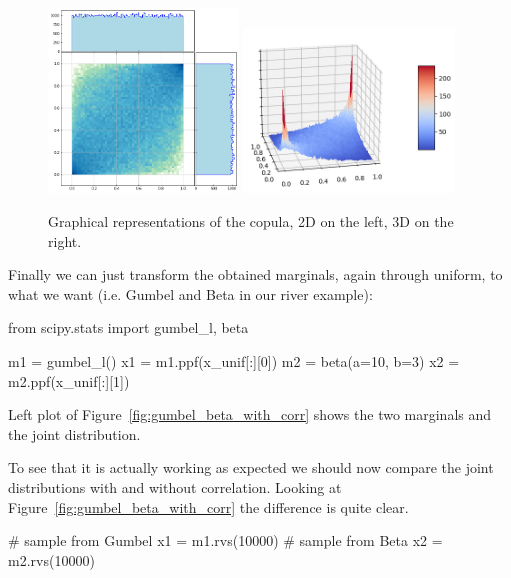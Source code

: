 \begin{figure}[htbp]
\centering
\includegraphics[width=0.45\textwidth]{figures/copula_2d}
\quad
\includegraphics[width=0.5\textwidth]{figures/copula_3d}
\caption{Graphical representations of the copula, 2D on the left, 3D on the right.}
\label{fig:copula}
\end{figure}

Finally we can just transform the obtained marginals, again through uniform, to what we want (i.e. Gumbel and Beta in our river example):

\begin{ipython}
from scipy.stats import gumbel_l, beta

m1 = gumbel_l()
x1 = m1.ppf(x_unif[:][0])
m2 = beta(a=10, b=3)
x2 = m2.ppf(x_unif[:][1])
\end{ipython}

Left plot of Figure~\ref{fig:gumbel_beta_with_corr} shows the two marginals and the joint distribution.
    
To see that it is actually working as expected we should now compare the joint distributions with and without correlation. Looking at Figure~\ref{fig:gumbel_beta_with_corr} the difference is quite clear.

\begin{ipython}
# sample from Gumbel
x1 = m1.rvs(10000)
# sample from Beta
x2 = m2.rvs(10000)
\end{ipython}

